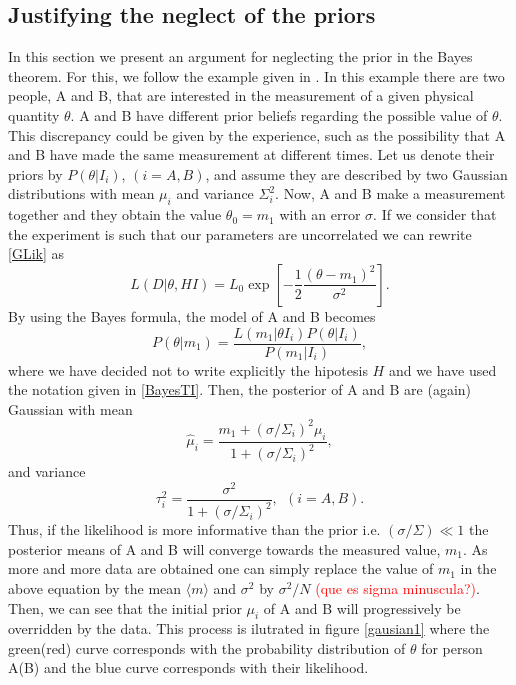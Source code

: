 \documentclass[onecolumn,           %
               showpacs,            %
               preprintnumbers,     %
               aps,                 %
               letterpaper,             %
               superscriptaddress,      %
               nofootinbib,         %
               tightenlines,        %
               floats,floatfix      %
               ,usenatbib,
               ]{revtex4-1}
\begin{document}
\subsection{Justifying the neglect of the priors}

In this section we present an argument for neglecting the prior in the Bayes theorem. For this, we follow the example given in \cite{RobT}. In this example there are two people, A and B, that are interested in the measurement of a given physical quantity $\theta$. A and B have different prior beliefs regarding the possible value of $\theta$. This discrepancy could be given by the experience, such as the possibility that A and B have made the same measurement at different times. Let us denote their priors by $P(\theta|I_i)$, $(i=A,B)$, and assume they are described by two Gaussian distributions with mean $\mu_i$ and variance $\Sigma_i^2$. Now, A and B make a measurement together and they obtain the value $\theta_0=m_1$ with an error $\sigma$. If we consider that the experiment is such that our parameters are uncorrelated we can rewrite \eqref{GLik} as
\begin{equation}\label{LikG}
L(D|\theta, HI)=L_0\exp\left[-\frac{1}{2}\frac{(\theta-m_1)^2}{\sigma^2}\right].
\end{equation}
By using the Bayes formula, the model of A and B becomes
\begin{equation}
P(\theta|m_1)=\frac{L(m_1|\theta I_i)P(\theta|I_i)}{P(m_1|I_i)},
\end{equation}
where we have decided not to write explicitly the hipotesis $H$ and we have used the notation given in \eqref{BayesTI}. Then, the posterior of A and B are (again) Gaussian with mean
\begin{equation}
\hat \mu_i = \frac{m_1+(\sigma/\Sigma_i)^2\mu_i}{1+(\sigma/\Sigma_i)^2},
\end{equation}
and variance 
\begin{equation}
\tau_i^2=\frac{\sigma^2}{1+(\sigma/\Sigma_i)^2}, \ \ (i=A,B).
\end{equation}
Thus, if the likelihood is more informative than the prior i.e. $(\sigma/\Sigma)\ll 1$ the posterior means of A and B will converge towards the measured value, $m_1$. As more and more data are obtained one can simply replace the value of $m_1$ in the above equation by the mean $\langle m\rangle$ and $\sigma^2$ by $\sigma^2/N$ \textcolor{red}{(que es sigma minuscula?)}. Then, we can see that the initial prior $\mu_i$ of A and B will progressively be overridden by the data. This process is ilutrated in figure \ref{gausian1} where the green(red) curve corresponds with the probability distribution of $\theta$ for person A(B) and the blue curve corresponds with their likelihood.\\
\end{document}
